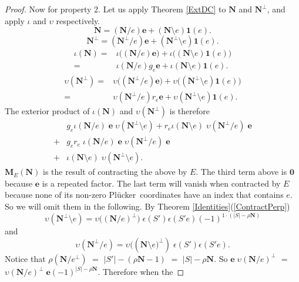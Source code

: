 \documentclass[12pt]{article}
\theoremstyle{definition}
\newcommand{\Is}{\ensuremath{\iota}}
\newcommand{\Vs}{\ensuremath{\upsilon}}
\newcommand{\Card}[1]{\ensuremath{{\left|#1\right|}}}
\newcommand{\ext}[1]{\ensuremath{\mathbf{#1}}}
\newcommand{\Plucker}{Pl\"{u}cker\ }
\begin{document}
\begin{proof}
Now for property 2.  
Let us apply Theorem \ref{ExtDC} to $\ext{N}$ and $\ext{N}^\perp$, and 
apply $\Is$ and $\Vs$ respectively.
\[
\ext{N}=(\ext{N}/e)\ext{e} + (\ext{N}\setminus e)\ext{1}(e).
\]
\[
\ext{N}^\perp=(\ext{N}^\perp/e)\ext{e} + (\ext{N}^\perp\setminus e)\ext{1}(e).
\]
\begin{equation*}
\begin{split}
\Is(\ext{N})=&
\Is\big((\ext{N}/e)\ext{e}\big) + \Is\big((\ext{N}\setminus e)\ext{1}(e)\big)\\
            =&\Is(\ext{N}/e)g_e\ext{e} + \Is(\ext{N}\setminus e)\ext{1}(e).
\end{split}
\end{equation*}
\begin{equation*}
\begin{split}
\Vs(\ext{N}^\perp)=&\Vs
\big((\ext{N}^\perp/e)\ext{e}\big) + 
\Vs\big((\ext{N}^\perp\setminus e)\ext{1}(e)\big)\\
                  =&\Vs(\ext{N}^\perp/e)r_e\ext{e} + \Vs(\ext{N}^\perp\setminus e)\ext{1}(e).
\end{split}
\end{equation*}
The exterior product of $\Is(\ext{N})$ and $\Vs(\ext{N}^\perp)$ is therefore
\begin{equation*}
\begin{split}
&g_e\Is(\ext{N}/e)\;\ext{e}\;\Vs(\ext{N}^\perp\setminus e)+
r_e\Is(\ext{N}\setminus e)\;\Vs(\ext{N}^\perp/e)\;\ext{e}\\
+&g_er_e\;\Is(\ext{N}/e)\;\ext{e}\;\Vs(\ext{N}^\perp/e)\;\ext{e}\\
+&\Is(\ext{N}\setminus e)\;\Vs(\ext{N}^\perp\setminus e).
\end{split}
\end{equation*}
$\ext{M}_E(\ext{N})$ is the result of contracting the above by $E$.
The third term above is $\ext{0}$ because $\ext{e}$ is a repeated factor.
The last term will vanish when contracted by $E$ because none of 
its non-zero \Plucker coordinates have an index that contains $e$.  So we
will omit them in the following.
By Theorem \ref{Identities}(\ref{ContractPerp})
\[
\Vs(\ext{N}^\perp\setminus e) = \Vs\big((\ext{N}/e)^\perp\big)\;
    \epsilon(S')\epsilon(S'e)(-1)^{1\cdot(\Card{S}-\rho\ext{N})}
\]
and
\[
\Vs(\ext{N}^\perp/e)=\Vs\big((\ext{N}\setminus e\big)^\perp)\;
\epsilon(S')\epsilon(S'e).
\]
Notice that $\rho(\ext{N}/e^\perp)$ $=$ $\Card{S'}-(\rho\ext{N}-1)$ 
$=$ $\Card{S}-\rho\ext{N}$.  So $\ext{e}\;\Vs(\ext{N}/e)^\perp$ $=$
$\Vs(\ext{N}/e)^\perp\;\ext{e}(-1)^{\Card{S}-\rho\ext{N}}$.  Therefore when the

\end{proof}
\end{document}
